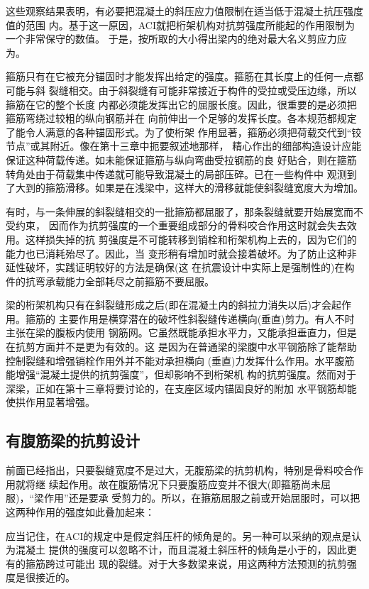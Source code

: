 \documentclass[12pt,a4paper]{book}
\begin{document}
这些观察结果表明，有必要把混凝土的斜压应力值限制在适当低于混凝土抗压强度值的范围
内。基于这一原因，ACI就把桁架机构对抗剪强度所能起的作用限制为一个非常保守的数值。
于是，按所取的大小得出梁内的绝对最大名义剪应力应为。

箍筋只有在它被充分锚固时才能发挥出给定的强度。箍筋在其长度上的任何一点都可能与斜
裂缝相交。由于斜裂缝有可能非常接近于构件的受拉或受压边缘，所以箍筋在它的整个长度
内都必须能发挥出它的屈服长度。因此，很重要的是必须把箍筋弯绕过较粗的纵向钢筋并在
向前伸出一个足够的发挥长度。各本规范都规定了能令人满意的各种锚固形式。为了使桁架
作用显著，箍筋必须把荷载交代到“铰节点”或其附近。像在第十三章中扼要叙述地那样，
精心作出的细部构造设计应能保证这种荷载传递。如未能保证箍筋与纵向弯曲受拉钢筋的良
好贴合，则在箍筋转角处由于荷载集中传递就可能导致混凝土的局部压碎。已在一些构件中
观测到了大到的箍筋滑移。如果是在浅梁中，这样大的滑移就能使斜裂缝宽度大为增加。

有时，与一条伸展的斜裂缝相交的一批箍筋都屈服了，那条裂缝就要开始展宽而不受约束，
因而作为抗剪强度的一个重要组成部分的骨料咬合作用这时就会失去效用。这样损失掉的抗
剪强度是不可能转移到销栓和桁架机构上去的，因为它们的能力也已消耗殆尽了。因此，当
变形稍有增加时就会接着破坏。为了防止这种非延性破坏，实践证明较好的方法是确保(这
在抗震设计中实际上是强制性的)在构件的抗弯承载能力全部耗尽之前箍筋不要屈服。

梁的桁架机构只有在斜裂缝形成之后(即在混凝土内的斜拉力消失以后)才会起作用。箍筋的
主要作用是横穿潜在的破坏性斜裂缝传递横向(垂直)剪力。有人不时主张在梁的腹板内使用
钢筋网。它虽然既能承担水平力，又能承担垂直力，但是在抗剪方面并不是更为有效的。这
是因为在普通梁的梁腹中水平钢筋除了能帮助控制裂缝和增强销栓作用外并不能对承担横向
(垂直)力发挥什么作用。水平腹筋能增强“混凝土提供的抗剪强度”，但却影响不到桁架机
构的抗剪强度。然而对于深梁，正如在第十三章将要讨论的，在支座区域内锚固良好的附加
水平钢筋却能使拱作用显著增强。

\subsection{有腹筋梁的抗剪设计}

前面已经指出，只要裂缝宽度不是过大，无腹筋梁的抗剪机构，特别是骨料咬合作用就将继
续起作用。故在腹筋情况下只要腹筋应变并不很大(即箍筋尚未屈服)，“梁作用”还是要承
受剪力的。所以，在箍筋屈服之前或开始屈服时，可以把这两种作用的强度如此叠加起来：

应当记住，在ACI的规定中是假定斜压杆的倾角是的。另一种可以采纳的观点是认为混凝土
提供的强度可以忽略不计，而且混凝土斜压杆的倾角是小于的，因此更有的箍筋跨过可能出
现的裂缝。对于大多数梁来说，用这两种方法预测的抗剪强度是很接近的。
\end{document}
